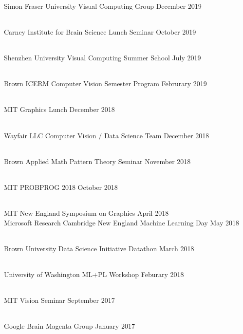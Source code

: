 \documentclass[line,margin]{res}
\begin{document}
\begin{resume}
\\
\talk
	{Simon Fraser University}
	{Visual Computing Group}
	{December 2019}

\\
\talk
	{Carney Institute for Brain Science}
	{Lunch Seminar}
	{October 2019}

\\
\talk
	{Shenzhen University}
	{Visual Computing Summer School}
	{July 2019}

\\
\talk
	{Brown ICERM}
	{Computer Vision Semester Program}
	{Februrary 2019}

\\
\talk
	{MIT}
	{Graphics Lunch}
	{December 2018}

\\
\talk
	{Wayfair LLC}
	{Computer Vision / Data Science Team}
	{December 2018}

\\
\talk
	{Brown Applied Math}
	{Pattern Theory Seminar}
	{November 2018}

\\
\talk
	{MIT}
	{PROBPROG 2018}
	{October 2018}

\\
\talk
	{MIT}
	{New England Symposium on Graphics}
	{April 2018}\\
\talk
	{Microsoft Research Cambridge}
	{New England Machine Learning Day}
	{May 2018}

\\
\talk
	{Brown University Data Science Initiative}
	{Datathon}
	{March 2018}

\\
\talk
	{University of Washington}
	{ML+PL Workshop}
	{Feburary 2018}

\\
\talk
	{MIT}
	{Vision Seminar}
	{September 2017}

\\
\talk
	{Google Brain}
	{Magenta Group}
	{January 2017}


\end{resume}
\end{document}
